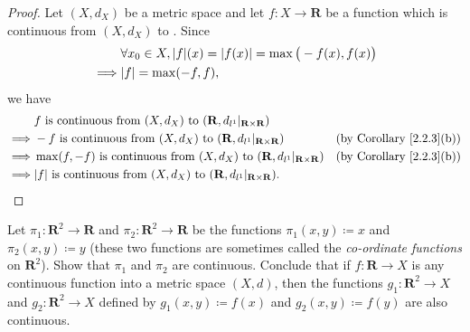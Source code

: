 \begin{proof}
    Let \((X, d_X)\) be a metric space and let \(f : X \to \mathbf{R}\) be a function which is continuous from \((X, d_X)\) to \(\).
    Since
    \begin{align*}
                 & \forall x_0 \in X, \abs*{f}(x) = \abs*{f(x)} = \max\big(-f(x), f(x)\big) \\
        \implies & \abs*{f} = \max(-f, f),
    \end{align*}
    we have
    \begin{align*}
                 & f \text{ is continuous from } (X, d_X) \text{ to } (\mathbf{R}, d_{l^1}|_{\mathbf{R} \times \mathbf{R}})                                                  \\
        \implies & -f \text{ is continuous from } (X, d_X) \text{ to } (\mathbf{R}, d_{l^1}|_{\mathbf{R} \times \mathbf{R}})          & \text{(by Corollary \ref{2.2.3}(b))} \\
        \implies & \max(f, -f) \text{ is continuous from } (X, d_X) \text{ to } (\mathbf{R}, d_{l^1}|_{\mathbf{R} \times \mathbf{R}}) & \text{(by Corollary \ref{2.2.3}(b))} \\
        \implies & \abs*{f} \text{ is continuous from } (X, d_X) \text{ to } (\mathbf{R}, d_{l^1}|_{\mathbf{R} \times \mathbf{R}}).
    \end{align*}
\end{proof}

\begin{exercise}\label{ex 2.2.4}
    Let \(\pi_1 : \mathbf{R}^2 \to \mathbf{R}\) and \(\pi_2 : \mathbf{R}^2 \to \mathbf{R}\) be the functions \(\pi_1(x, y) \coloneqq x\) and \(\pi_2(x, y) \coloneqq y\) (these two functions are sometimes called the \emph{co-ordinate functions} on \(\mathbf{R}^2\)).
    Show that \(\pi_1\) and \(\pi_2\) are continuous.
    Conclude that if \(f : \mathbf{R} \to X\) is any continuous function into a metric space \((X, d)\), then the functions \(g_1 : \mathbf{R}^2 \to X\) and \(g_2 : \mathbf{R}^2 \to X\) defined by \(g_1(x, y) \coloneqq f(x)\) and \(g_2(x, y) \coloneqq f(y)\) are also continuous.
\end{exercise}

